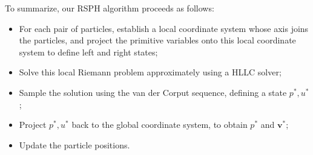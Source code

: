 \documentclass[review]{elsarticle}
\begin{document}


To summarize, our RSPH algorithm proceeds as follows:
\begin{itemize}
\item For each pair of particles, establish a local coordinate system whose axis joins the
particles,
and project the primitive variables onto this local coordinate system to define
left and right states;
\item Solve this local Riemann problem approximately using a HLLC solver;
\item Sample the solution using the van der Corput sequence,
defining a state  $p^{\ast}, u^{\ast}$;
\item Project $p^{\ast}, u^{\ast}$  back to the global coordinate system,
to obtain $p^{\ast}$ and $\textbf{v}^{\ast}$;
\item Update the particle positions.
\end{itemize}
\end{document}
